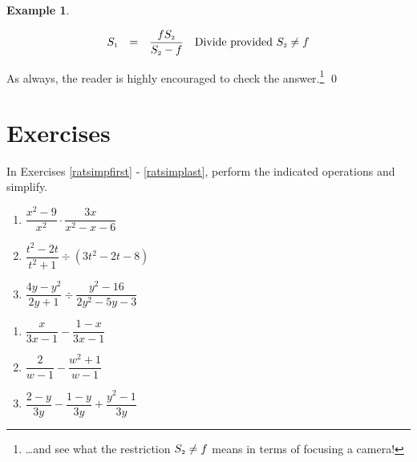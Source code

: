 \documentclass[11pt]{article}
\theoremstyle{definition}  %
\newtheorem{ex}{\bf Example}
\newcounter{HW}
\begin{document}
\begin{ex}
\begin{enumerate}
\[\begin{array}{rclr}
S_{\text{\tiny $1$}} & = & \dfrac{f S_{\text{\tiny $2$}}}{S_{\text{\tiny $2$}} - f} & \text{Divide provided  $S_{\text{\tiny $2$}} \neq f$}  \\

\end{array}\]

As always, the reader is highly encouraged to check the answer.\footnote{\ldots and see what the restriction $S_{\text{\tiny $2$}} \neq f$ means in terms of focusing a camera!}  \qed

\end{enumerate}

\end{ex}

\newpage

\section{Exercises}

In Exercises \ref{ratsimpfirst} - \ref{ratsimplast}, perform the indicated operations and simplify.

\begin{multicols}{3}
\begin{enumerate}

\item $\dfrac{x^2-9}{x^2} \cdot \dfrac{3x}{x^2-x-6}$\label{ratsimpfirst}
\item $\dfrac{t^2-2t}{t^2+1} \div (3t^2 - 2t - 8)$
\item $\dfrac{4y-y^2}{2y+1} \div \dfrac{y^2-16}{2y^2-5y-3}$

\setcounter{HW}{\value{enumi}}
\end{enumerate}
\end{multicols}

\begin{multicols}{3}
\begin{enumerate}
\setcounter{enumi}{\value{HW}}

\item  $\dfrac{x}{3x-1} - \dfrac{1-x}{3x-1}$
\item  $\dfrac{2}{w-1} - \dfrac{w^2+1}{w-1}$
\item  $\dfrac{2-y}{3y} - \dfrac{1-y}{3y} + \dfrac{y^2-1}{3y}$
 

\setcounter{HW}{\value{enumi}}
\end{enumerate}
\end{multicols}
\end{document}
